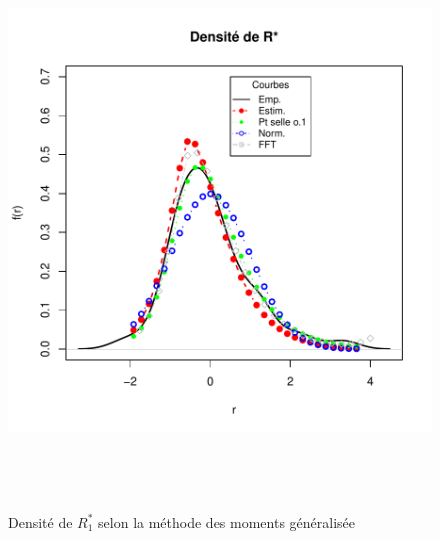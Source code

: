 \begin{figure}[!ht]
  \centering
  \includegraphics[height=6in,
  width=6in]{../graphiques/ABBEYN-densiteGALmu-7.pdf}
  \caption{Densité de $R_1^{*}$ selon la méthode des moments
    généralisée}
  \label{fig:densite1R1}
\end{figure}

